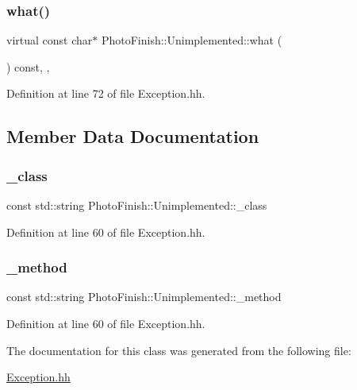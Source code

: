 \subsubsection{\texorpdfstring{what()}{what()}}
{\footnotesize\ttfamily virtual const char$\ast$ Photo\+Finish\+::\+Unimplemented\+::what (\begin{DoxyParamCaption}{ }\end{DoxyParamCaption}) const\hspace{0.3cm}{\ttfamily [inline]}, {\ttfamily [virtual]}, {\ttfamily [noexcept]}}



Definition at line 72 of file Exception.\+hh.



\subsection{Member Data Documentation}
\mbox{\label{class_photo_finish_1_1_unimplemented_aecf1e72e18a877c34af703714c8a4f01}} 
\subsubsection{\texorpdfstring{\+\_\+class}{\_class}}
{\footnotesize\ttfamily const std\+::string Photo\+Finish\+::\+Unimplemented\+::\+\_\+class\hspace{0.3cm}{\ttfamily [protected]}}



Definition at line 60 of file Exception.\+hh.

\mbox{\label{class_photo_finish_1_1_unimplemented_a625e70a81660e6b321dca2c782d42e87}} 
\subsubsection{\texorpdfstring{\+\_\+method}{\_method}}
{\footnotesize\ttfamily const std\+::string Photo\+Finish\+::\+Unimplemented\+::\+\_\+method\hspace{0.3cm}{\ttfamily [protected]}}



Definition at line 60 of file Exception.\+hh.



The documentation for this class was generated from the following file\+:\begin{DoxyCompactItemize}
\item 
\hyperlink{_exception_8hh}{Exception.\+hh}\end{DoxyCompactItemize}
